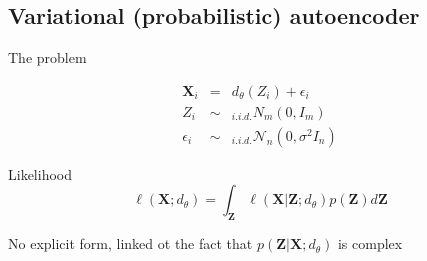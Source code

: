 \documentclass[compress,10pt]{beamer}
\begin{document}
\subsection{Variational (probabilistic)
autoencoder}


\begin{frame}{The problem}

\begin{eqnarray*}
 \mathbf{X}_i &=&d_\theta(Z_i) + \epsilon_i \\
 Z_i &\sim&_{i.i.d.}N_m(0,I_m)\\
 \epsilon_i &\sim&_{i.i.d.} \mathcal{N}_n(0,\sigma^2 I_n)
\end{eqnarray*}

Likelihood
  \[\ell(\mathbf{X}; d_{\theta})  =  \int_{\mathbf{Z}} \ell(\mathbf{X} | \mathbf{Z};d_\theta)p(\mathbf{Z})d\mathbf{Z}\]

No explicit form, linked ot the fact that $p(\mathbf{Z}  | \mathbf{X};d_{\theta})$ is complex
  
\end{frame}
\end{document}
